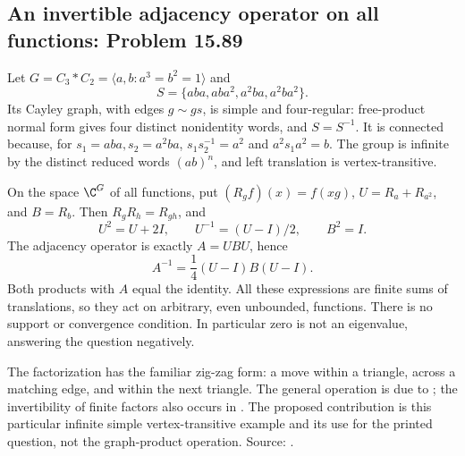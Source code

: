 \subsection{An invertible adjacency operator on all functions: Problem 15.89}
\label{cand:15.89}

Let \(G=C_3*C_2=\langle a,b:a^3=b^2=1\rangle\) and
\[
 S=\{aba,aba^2,a^2ba,a^2ba^2\}.
\]
Its Cayley graph, with edges \(g\sim gs\), is simple
and four-regular: free-product normal form gives four
distinct nonidentity words, and \(S=S^{-1}\).
It is connected because, for \(s_1=aba,s_2=a^2ba\),
\(s_1s_2^{-1}=a^2\) and \(a^2s_1a^2=b\).
The group is infinite by the distinct reduced words
\((ab)^n\), and left translation is vertex-transitive.

On the space \(\C^G\) of all functions, put
\((R_gf)(x)=f(xg)\), \(U=R_a+R_{a^2}\), and
\(B=R_b\). Then \(R_gR_h=R_{gh}\), and
\[
 U^2=U+2I,\qquad U^{-1}=(U-I)/2,\qquad B^2=I.
\]
The adjacency operator is exactly \(A=UBU\), hence
\[
 A^{-1}=\frac14(U-I)B(U-I).
\]
Both products with \(A\) equal the identity.
All these expressions are finite sums of translations,
so they act on arbitrary, even unbounded, functions.
There is no support or convergence condition.
In particular zero is not an eigenvalue, answering
the question negatively.

The factorization has the familiar zig-zag form:
a move within a triangle, across a matching edge,
and within the next triangle. The general operation
is due to \cite{zigzag}; the invertibility of finite
factors also occurs in \cite{permutational-powers}.
The proposed contribution is this particular infinite
simple vertex-transitive example and its use for
the printed question, not the graph-product operation.
Source: .

